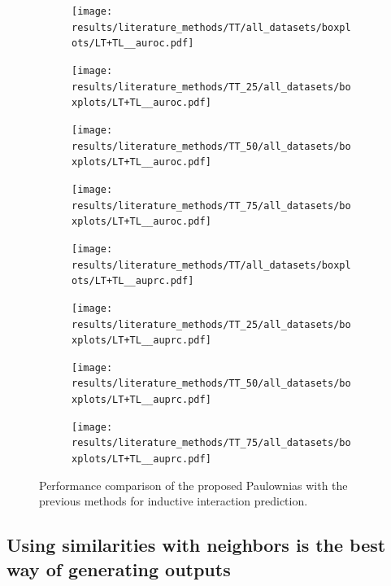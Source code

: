 \documentclass{article}
\begin{document}
\begin{figure}
    \centering
    \begin{subfigure}{.24\textwidth}
        \texttt{[image: results/literature\_methods/TT/all\_datasets/boxplots/LT+TL\_\_auroc.pdf]}
    \end{subfigure}
    \begin{subfigure}{.24\textwidth}
        \texttt{[image: results/literature\_methods/TT\_25/all\_datasets/boxplots/LT+TL\_\_auroc.pdf]}
    \end{subfigure}
    \begin{subfigure}{.24\textwidth}
        \texttt{[image: results/literature\_methods/TT\_50/all\_datasets/boxplots/LT+TL\_\_auroc.pdf]}
    \end{subfigure}
    \begin{subfigure}{.24\textwidth}
        \texttt{[image: results/literature\_methods/TT\_75/all\_datasets/boxplots/LT+TL\_\_auroc.pdf]}
    \end{subfigure}

     \begin{subfigure}{.24\textwidth}
        \texttt{[image: results/literature\_methods/TT/all\_datasets/boxplots/LT+TL\_\_auprc.pdf]}
    \end{subfigure}
    \begin{subfigure}{.24\textwidth}
        \texttt{[image: results/literature\_methods/TT\_25/all\_datasets/boxplots/LT+TL\_\_auprc.pdf]}
    \end{subfigure}
    \begin{subfigure}{.24\textwidth}
        \texttt{[image: results/literature\_methods/TT\_50/all\_datasets/boxplots/LT+TL\_\_auprc.pdf]}
    \end{subfigure}
    \begin{subfigure}{.24\textwidth}
        \texttt{[image: results/literature\_methods/TT\_75/all\_datasets/boxplots/LT+TL\_\_auprc.pdf]}
    \end{subfigure}   
    \caption{Performance comparison of the proposed Paulownias with the previous methods for inductive interaction prediction.}
    \label{fig:literature_LTTL}
\end{figure}


\subsection{Using similarities with neighbors is the best way of generating outputs}
\end{document}
